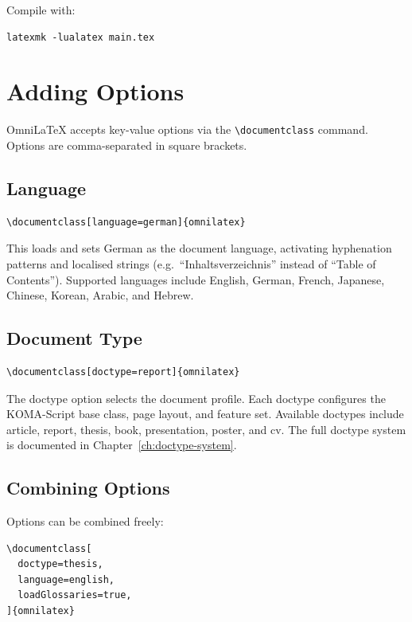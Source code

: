 Compile with:

\begin{verbatim}
latexmk -lualatex main.tex
\end{verbatim}

\section{Adding Options}

OmniLaTeX accepts key-value options via the \texttt{\textbackslash documentclass}
command.  Options are comma-separated in square brackets.

\subsection{Language}

\begin{verbatim}
\documentclass[language=german]{omnilatex}
\end{verbatim}

This loads  and sets German as the document language,
activating hyphenation patterns and localised strings (e.g.\ ``Inhaltsverzeichnis''
instead of ``Table of Contents'').  Supported languages include English, German,
French, Japanese, Chinese, Korean, Arabic, and Hebrew.

\subsection{Document Type}

\begin{verbatim}
\documentclass[doctype=report]{omnilatex}
\end{verbatim}

The \textsf{doctype} option selects the document profile.  Each doctype
configures the KOMA-Script base class, page layout, and feature set.
Available doctypes include \textsf{article}, \textsf{report},
\textsf{thesis}, \textsf{book}, \textsf{presentation},
\textsf{poster}, and \textsf{cv}.  The full doctype system is documented in
Chapter~\ref{ch:doctype-system}.

\subsection{Combining Options}

Options can be combined freely:

\begin{verbatim}
\documentclass[
  doctype=thesis,
  language=english,
  loadGlossaries=true,
]{omnilatex}
\end{verbatim}

